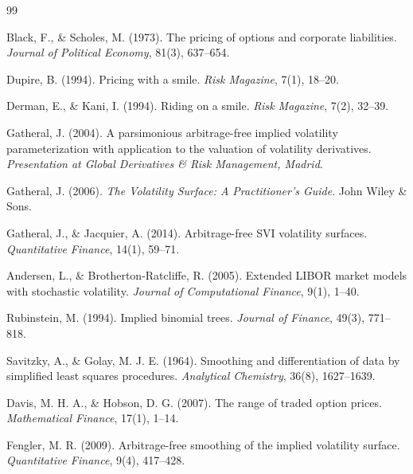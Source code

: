 \documentclass[12pt,a4paper]{article}
\begin{document}
\begin{thebibliography}{99}

Black, F., \& Scholes, M. (1973).
The pricing of options and corporate liabilities.
\textit{Journal of Political Economy}, 81(3), 637--654.

Dupire, B. (1994).
Pricing with a smile.
\textit{Risk Magazine}, 7(1), 18--20.

Derman, E., \& Kani, I. (1994).
Riding on a smile.
\textit{Risk Magazine}, 7(2), 32--39.

Gatheral, J. (2004).
A parsimonious arbitrage-free implied volatility parameterization with application to the valuation of volatility derivatives.
\textit{Presentation at Global Derivatives \& Risk Management, Madrid}.

Gatheral, J. (2006).
\textit{The Volatility Surface: A Practitioner's Guide}.
John Wiley \& Sons.

Gatheral, J., \& Jacquier, A. (2014).
Arbitrage-free SVI volatility surfaces.
\textit{Quantitative Finance}, 14(1), 59--71.

Andersen, L., \& Brotherton-Ratcliffe, R. (2005).
Extended LIBOR market models with stochastic volatility.
\textit{Journal of Computational Finance}, 9(1), 1--40.

Rubinstein, M. (1994).
Implied binomial trees.
\textit{Journal of Finance}, 49(3), 771--818.

Savitzky, A., \& Golay, M. J. E. (1964).
Smoothing and differentiation of data by simplified least squares procedures.
\textit{Analytical Chemistry}, 36(8), 1627--1639.

Davis, M. H. A., \& Hobson, D. G. (2007).
The range of traded option prices.
\textit{Mathematical Finance}, 17(1), 1--14.

Fengler, M. R. (2009).
Arbitrage-free smoothing of the implied volatility surface.
\textit{Quantitative Finance}, 9(4), 417--428.

\end{thebibliography}
\end{document}

